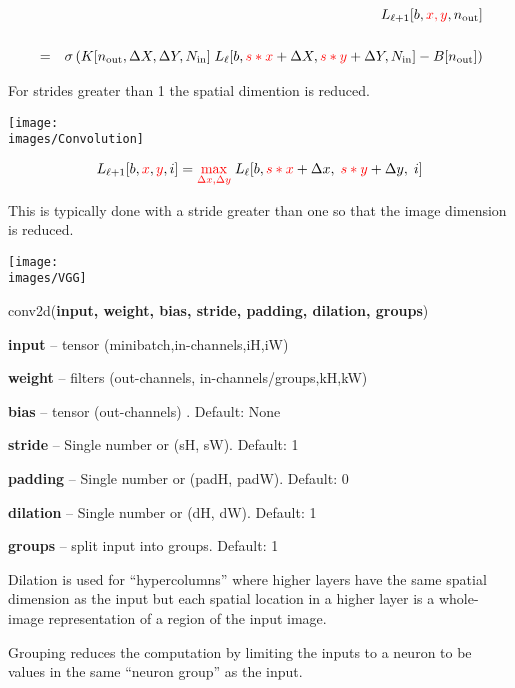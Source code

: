 {\vfill
{\huge
\begin{eqnarray*}
 & &  L_{{\ell+1}}[b,{\color{red}x,y},n_{\mathrm{out}}] \\
 \\
  & = &   \sigma\left(K[n_{\mathrm{out}},\Delta X, \Delta Y,N_{\mathrm{in}}]\; L_{{\ell}}[b,{\color{red} s*x} + \Delta X, {\color{red} s*y} + \Delta Y, N_{\mathrm{in}}] - B[n_{\mathrm{out}}]\right)
\end{eqnarray*}
}

\vfill
For strides greater than 1 the spatial dimention is reduced.


\centerline{\texttt{[image: \\images/Convolution]}}

\vfill
$$L_{{\ell+1}}[b,{\color{red}x},{\color{red}y},i] = {\color{red} \max_{\Delta x, \Delta y}}\; L_{{\ell}}[b,{\color{red} s*x} + \Delta x,\; {\color{red} s*y} + \Delta y,\; i]$$

\vfill
This is typically done with a stride greater than one so that the image dimension is reduced.


\centerline{\texttt{[image: \\images/VGG]}}



conv2d({\bf input, weight, bias, stride, padding, dilation, groups})

\bigskip
{\bf input} – tensor (minibatch,in-channels,iH,iW)

\medskip
{\bf weight} – filters (out-channels, in-channels/groups,kH,kW)

\medskip
{\bf bias} – tensor (out-channels) . Default: None

\medskip
{\bf stride} – Single number or (sH, sW). Default: 1

\medskip
{\bf padding} – Single number or (padH, padW). Default: 0

\medskip
{\bf dilation} – Single number or (dH, dW). Default: 1

\medskip
{\bf groups} – split input into groups. Default: 1


Dilation is used for ``hypercolumns'' where higher layers have the same spatial dimension as the input but each spatial location in a higher layer
is a whole-image representation of a region of the input image.

\vfill
Grouping reduces the computation by limiting the inputs to a neuron to be values in the same ``neuron group'' as the input.

}
